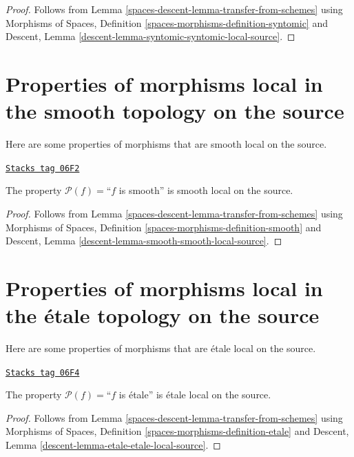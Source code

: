 \begin{proof}
Follows from
Lemma \ref{spaces-descent-lemma-transfer-from-schemes}
using
Morphisms of Spaces, Definition \ref{spaces-morphisms-definition-syntomic}
and
Descent, Lemma \ref{descent-lemma-syntomic-syntomic-local-source}.
\end{proof}

\section{Properties of morphisms local in the smooth topology on the source}
\label{spaces-descent-section-smooth-local-source}
Here are some properties of morphisms that are smooth local on the source.

\begin{lemma}
\label{spaces-descent-lemma-smooth-smooth-local-source}
\href{https://stacks.math.columbia.edu/tag/06F2}{\texttt{Stacks tag 06F2}}

The property $\mathcal{P}(f)=$``$f$ is smooth''
is smooth local on the source.
\end{lemma}

\begin{proof}
Follows from
Lemma \ref{spaces-descent-lemma-transfer-from-schemes}
using
Morphisms of Spaces, Definition \ref{spaces-morphisms-definition-smooth}
and
Descent, Lemma \ref{descent-lemma-smooth-smooth-local-source}.
\end{proof}

\section{Properties of morphisms local in the \'etale topology on the source}
\label{spaces-descent-section-etale-local-source}
Here are some properties of morphisms that are \'etale local on the source.

\begin{lemma}
\label{spaces-descent-lemma-etale-etale-local-source}
\href{https://stacks.math.columbia.edu/tag/06F4}{\texttt{Stacks tag 06F4}}

The property $\mathcal{P}(f)=$``$f$ is \'etale''
is \'etale local on the source.
\end{lemma}

\begin{proof}
Follows from
Lemma \ref{spaces-descent-lemma-transfer-from-schemes}
using
Morphisms of Spaces,
Definition \ref{spaces-morphisms-definition-etale}
and
Descent, Lemma \ref{descent-lemma-etale-etale-local-source}.
\end{proof}

